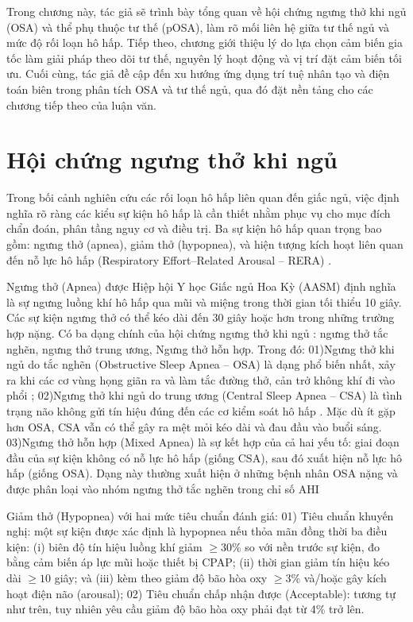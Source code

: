 
Trong chương này, tác giả sẽ trình bày tổng quan về hội chứng ngưng thở khi ngủ (OSA) và thể phụ thuộc tư thế (pOSA), làm rõ mối liên hệ giữa tư thế ngủ và mức độ rối loạn hô hấp. Tiếp theo, chương giới thiệu lý do lựa chọn cảm biến gia tốc làm giải pháp theo dõi tư thế, nguyên lý hoạt động và vị trí đặt cảm biến tối ưu. Cuối cùng, tác giả đề cập đến xu hướng ứng dụng trí tuệ nhân tạo và điện toán biên trong phân tích OSA và tư thế ngủ, qua đó đặt nền tảng cho các chương tiếp theo của luận văn.
\section{Hội chứng ngưng thở khi ngủ}

Trong bối cảnh nghiên cứu các rối loạn hô hấp liên quan đến giấc ngủ, 
việc định nghĩa rõ ràng các kiểu sự kiện hô hấp là 
cần thiết nhằm phục vụ cho mục đích chẩn đoán, 
phân tầng nguy cơ và điều trị. 
Ba sự kiện hô hấp quan trọng bao gồm: ngưng thở (apnea), giảm thở (hypopnea), và hiện tượng kích hoạt liên quan đến nỗ lực hô hấp
(Respiratory Effort–Related Arousal – RERA) \cite{berry2012scoring}.

Ngưng thở (Apnea) được Hiệp hội Y học Giấc ngủ Hoa Kỳ (AASM) định nghĩa là 
sự ngưng luồng khí hô hấp qua mũi và miệng trong thời gian tối thiểu 10 giây. 
Các sự kiện ngưng thở có thể kéo dài đến 30 giây hoặc hơn trong những trường hợp nặng.
Có ba dạng chính của hội chứng ngưng thở khi ngủ \cite{ThaySYOSA}: ngưng thở tắc nghẽn, ngưng thở trung ương, Ngưng thở hỗn hợp. Trong đó: 
01)Ngưng thở khi ngủ do tắc nghẽn (Obstructive Sleep Apnea – OSA) là dạng phổ biến nhất, xảy ra khi các cơ vùng họng giãn ra và làm tắc đường thở, cản trở không khí đi vào phổi \cite{osa_summary}; 
02)Ngưng thở khi ngủ do trung ương (Central Sleep Apnea – CSA) là tình trạng não không gửi tín hiệu đúng đến các cơ kiểm soát hô hấp \cite{eckert2007csa}. Mặc dù ít gặp hơn OSA, CSA vẫn có thể gây ra mệt mỏi kéo dài và đau đầu vào buổi sáng.
03)Ngưng thở hỗn hợp (Mixed Apnea) là sự kết hợp của cả hai yếu tố: giai đoạn đầu của sự kiện không có nỗ lực hô hấp (giống CSA), sau đó xuất hiện nỗ lực hô hấp (giống OSA). 
Dạng này thường xuất hiện ở những bệnh nhân OSA nặng và được phân loại vào nhóm ngưng thở tắc nghẽn trong chỉ số AHI

Giảm thở (Hypopnea) với hai mức tiêu chuẩn đánh giá: 
01) Tiêu chuẩn khuyến nghị: một sự kiện được xác định 
là hypopnea nếu thỏa mãn đồng thời ba điều kiện: 
(i) biên độ tín hiệu luồng khí giảm $\geq 30$\% so với nền trước sự kiện, 
đo bằng cảm biến áp lực mũi hoặc thiết bị CPAP; 
(ii) thời gian giảm tín hiệu kéo dài $\geq 10$ giây; 
và (iii) kèm theo giảm độ bão hòa oxy $\geq 3$\% và/hoặc gây kích hoạt điện não (arousal); 
02) Tiêu chuẩn chấp nhận được (Acceptable): tương tự như trên, tuy nhiên yêu cầu giảm độ bão hòa 
oxy phải đạt từ 4\% trở lên.

